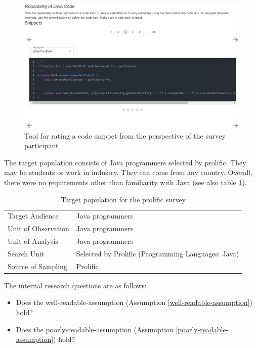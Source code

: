 \documentclass[%
class=scrreprt,
chapterprefix=false,%
open=right,%
twoside=false,%
paper=a4,%
logofile={Logo\_zentral\_farbig\_EN.png},%
thesistype=master,%
UKenglish,%
]{se2thesis}
\theoremstyle{definition}
\begin{document}
	\begin{figure}[t]
		\centering
		\includegraphics[width=\textwidth]{img/survey_tool.png}
		\caption{Tool for rating a code snippet from the perspective of the survey participant}
		\label{fig:survey_tool}
	\end{figure}

	The target population consists of Java programmers selected by prolific. They may be students or work in industry. They can come from any country. Overall, there were no requirements other than familiarity with Java (see also table \ref{tab:prolific-audience}).
	\begin{table}
		\begin{tabular}{|l|l|}
			\hline
			Target Audience      & Java programmers \\
			Unit of Observation  & Java programmers \\
			Unit of Analysis     & Java programmers \\
			Search Unit          & Selected by Prolific (Programming Languages: Java)\\
			Source of Sampling   & Prolific \\
			\hline
		\end{tabular}
		\caption{Target population for the prolific survey}
		\label{tab:prolific-audience}
	\end{table}
	
	The internal research questions are as follows:
	\begin{itemize}
		\item Does the well-readable-assumption (Assumption \ref{well-readable-assumption}) hold?
		\item Does the poorly-readable-assumption (Assumption \ref{poorly-readable-assumption}) hold?
	\end{itemize}
	
\end{document}
